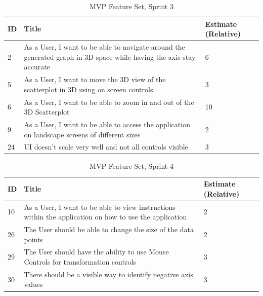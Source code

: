 \begin{table}[h]
    \begin{tabularx}{\textwidth}{ | X | X | X | }
        \hline
        ID & Title                                                                                                               & Estimate (Relative) \\
        \hline
        2  & As a User, I want to be able to navigate around the generated graph in 3D space while having the axis stay accurate & 6                   \\
        \hline
        5  & As a User, I want to move the 3D view of the scatterplot in 3D using on screen controls                             & 3                   \\
        \hline
        6  & As a User, I want to be able to zoom in and out of the 3D Scatterplot                                               & 10                  \\
        \hline
        9  & As a User, I want to be able to access the application on landscape screens of different sizes                      & 2                   \\
        \hline
        24 & UI doesn't scale very well and not all controls visible                                                             & 3                   \\
        \hline
    \end{tabularx}
    \caption{MVP Feature Set, Sprint 3}
    \label{sprint3}
\end{table}

\begin{table}[h]
    \begin{tabularx}{\textwidth}{ | X | X | X | }
        \hline
        ID & Title                                                                                                  & Estimate (Relative) \\
        \hline
        10 & As a User, I want to be able to view instructions within the application on how to use the application & 2                   \\
        \hline
        26 & The User should be able to change the size of the data points                                          & 2                   \\
        \hline
        29 & The User should have the ability to use Mouse Controls for transformation controls                     & 3                   \\
        \hline
        30 & There should be a visible way to identify negative axis values                                         & 3                   \\
        \hline
    \end{tabularx}
    \caption{MVP Feature Set, Sprint 4}
    \label{sprint4}
\end{table}

